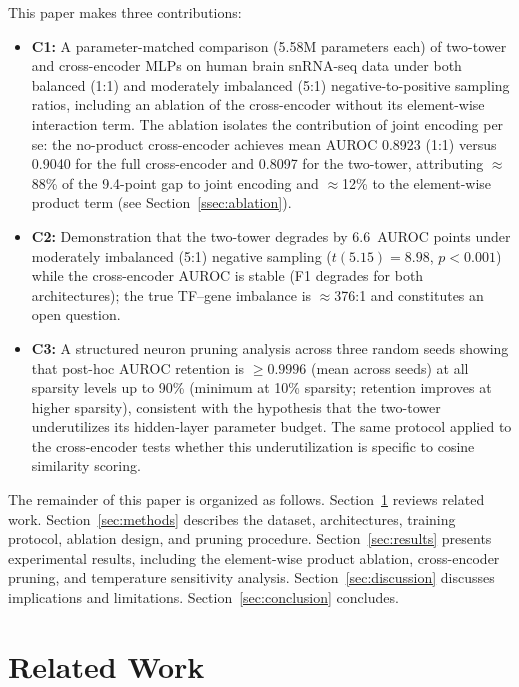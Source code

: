 \documentclass[journal]{IEEEtran}
\begin{document}
This paper makes three contributions:
\begin{itemize}
\item \textbf{C1:} A parameter-matched comparison (5.58M parameters each)
  of two-tower and cross-encoder MLPs on human brain snRNA-seq data under
  both balanced (1:1) and moderately imbalanced (5:1) negative-to-positive
  sampling ratios, including an ablation of the cross-encoder without its
  element-wise interaction term. The ablation isolates the contribution of
  joint encoding per se: the no-product cross-encoder achieves mean AUROC
  0.8923 (1:1) versus 0.9040 for the full cross-encoder and 0.8097 for the
  two-tower, attributing $\approx$88\% of the 9.4-point gap to joint encoding
  and $\approx$12\% to the element-wise product term
  (see Section~\ref{ssec:ablation}).
\item \textbf{C2:} Demonstration that the two-tower degrades by 6.6~AUROC
  points under moderately imbalanced (5:1) negative sampling
  ($t(5.15)=8.98$, $p<0.001$) while the cross-encoder AUROC is stable (F1
  degrades for both architectures); the true TF--gene imbalance is
  $\approx$376:1 and constitutes an open question.
\item \textbf{C3:} A structured neuron pruning analysis across three random
  seeds showing that post-hoc AUROC retention is $\geq 0.9996$ (mean across
  seeds) at all sparsity levels up to 90\% (minimum at 10\% sparsity;
  retention improves at higher sparsity), consistent with the hypothesis that
  the two-tower underutilizes its hidden-layer parameter budget. The same
  protocol applied to the cross-encoder tests whether this underutilization
  is specific to cosine similarity scoring.
\end{itemize}

The remainder of this paper is organized as follows.
Section~\ref{sec:related} reviews related work.
Section~\ref{sec:methods} describes the dataset, architectures, training
protocol, ablation design, and pruning procedure.
Section~\ref{sec:results} presents experimental results, including the
element-wise product ablation, cross-encoder pruning, and temperature
sensitivity analysis.
Section~\ref{sec:discussion} discusses implications and limitations.
Section~\ref{sec:conclusion} concludes.

\section{Related Work}
\label{sec:related}
\end{document}
